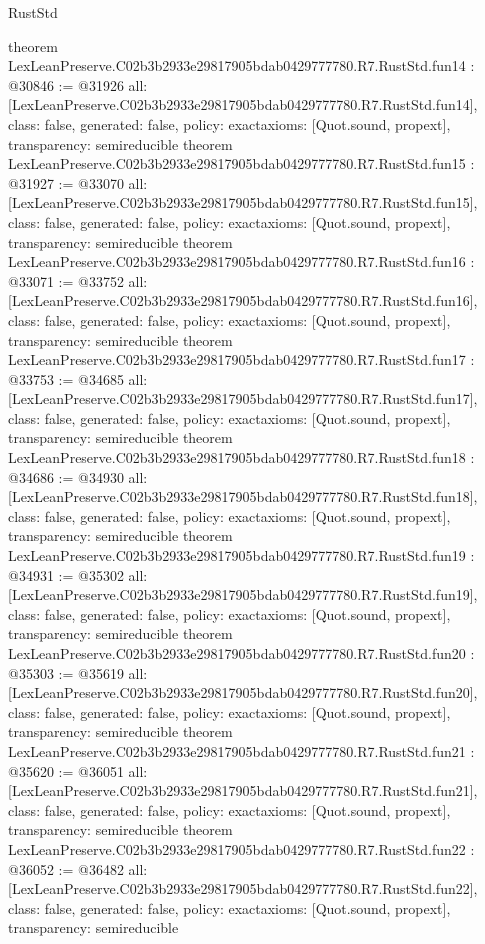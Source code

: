 \begin{lexlean}{RustStd}
\begin{coremodule}
{}
theorem LexLeanPreserve.C02b3b2933e29817905bdab0429777780.R7.RustStd.fun14 : @30846 := @31926 {
  all: [LexLeanPreserve.C02b3b2933e29817905bdab0429777780.R7.RustStd.fun14],
  class: false,
  generated: false,
  policy: exact{axioms: [Quot.sound, propext]},
  transparency: semireducible
}
theorem LexLeanPreserve.C02b3b2933e29817905bdab0429777780.R7.RustStd.fun15 : @31927 := @33070 {
  all: [LexLeanPreserve.C02b3b2933e29817905bdab0429777780.R7.RustStd.fun15],
  class: false,
  generated: false,
  policy: exact{axioms: [Quot.sound, propext]},
  transparency: semireducible
}
theorem LexLeanPreserve.C02b3b2933e29817905bdab0429777780.R7.RustStd.fun16 : @33071 := @33752 {
  all: [LexLeanPreserve.C02b3b2933e29817905bdab0429777780.R7.RustStd.fun16],
  class: false,
  generated: false,
  policy: exact{axioms: [Quot.sound, propext]},
  transparency: semireducible
}
theorem LexLeanPreserve.C02b3b2933e29817905bdab0429777780.R7.RustStd.fun17 : @33753 := @34685 {
  all: [LexLeanPreserve.C02b3b2933e29817905bdab0429777780.R7.RustStd.fun17],
  class: false,
  generated: false,
  policy: exact{axioms: [Quot.sound, propext]},
  transparency: semireducible
}
theorem LexLeanPreserve.C02b3b2933e29817905bdab0429777780.R7.RustStd.fun18 : @34686 := @34930 {
  all: [LexLeanPreserve.C02b3b2933e29817905bdab0429777780.R7.RustStd.fun18],
  class: false,
  generated: false,
  policy: exact{axioms: [Quot.sound, propext]},
  transparency: semireducible
}
theorem LexLeanPreserve.C02b3b2933e29817905bdab0429777780.R7.RustStd.fun19 : @34931 := @35302 {
  all: [LexLeanPreserve.C02b3b2933e29817905bdab0429777780.R7.RustStd.fun19],
  class: false,
  generated: false,
  policy: exact{axioms: [Quot.sound, propext]},
  transparency: semireducible
}
theorem LexLeanPreserve.C02b3b2933e29817905bdab0429777780.R7.RustStd.fun20 : @35303 := @35619 {
  all: [LexLeanPreserve.C02b3b2933e29817905bdab0429777780.R7.RustStd.fun20],
  class: false,
  generated: false,
  policy: exact{axioms: [Quot.sound, propext]},
  transparency: semireducible
}
theorem LexLeanPreserve.C02b3b2933e29817905bdab0429777780.R7.RustStd.fun21 : @35620 := @36051 {
  all: [LexLeanPreserve.C02b3b2933e29817905bdab0429777780.R7.RustStd.fun21],
  class: false,
  generated: false,
  policy: exact{axioms: [Quot.sound, propext]},
  transparency: semireducible
}
theorem LexLeanPreserve.C02b3b2933e29817905bdab0429777780.R7.RustStd.fun22 : @36052 := @36482 {
  all: [LexLeanPreserve.C02b3b2933e29817905bdab0429777780.R7.RustStd.fun22],
  class: false,
  generated: false,
  policy: exact{axioms: [Quot.sound, propext]},
  transparency: semireducible
}
\end{coremodule}
\end{lexlean}
